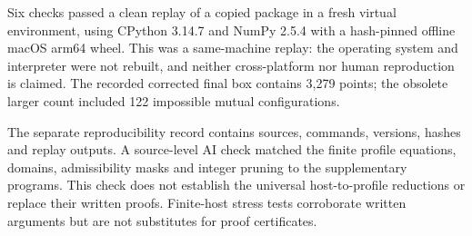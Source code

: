 Six checks passed a clean replay of a copied package in a fresh virtual environment, using CPython 3.14.7 and NumPy 2.5.4 with a hash-pinned offline macOS arm64 wheel. This was a same-machine replay: the operating system and interpreter were not rebuilt, and neither cross-platform nor human reproduction is claimed. The recorded corrected final box contains 3,279 points; the obsolete larger count included 122 impossible mutual configurations.

The separate reproducibility record contains sources, commands, versions, hashes and replay outputs. A source-level AI check matched the finite profile equations, domains, admissibility masks and integer pruning to the supplementary programs. This check does not establish the universal host-to-profile reductions or replace their written proofs. Finite-host stress tests corroborate written arguments but are not substitutes for proof certificates.

\clearpage
